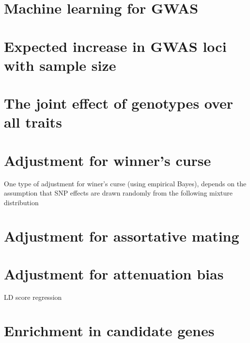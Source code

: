 \documentclass[
]{book}
\begin{document}
\hypertarget{machine-learning-for-gwas}{%
\section{Machine learning for GWAS}\label{machine-learning-for-gwas}}

\hypertarget{expected-increase-in-gwas-loci-with-sample-size}{%
\section{Expected increase in GWAS loci with sample size}\label{expected-increase-in-gwas-loci-with-sample-size}}

\hypertarget{the-joint-effect-of-genotypes-over-all-traits}{%
\section{The joint effect of genotypes over all traits}\label{the-joint-effect-of-genotypes-over-all-traits}}

\hypertarget{adjustment-for-winners-curse}{%
\section{Adjustment for winner's curse}\label{adjustment-for-winners-curse}}

One type of adjustment for winer's curse (using empirical Bayes), depends on the assumption that SNP effects are drawn randomly from the following mixture distribution

\hypertarget{adjustment-for-assortative-mating}{%
\section{Adjustment for assortative mating}\label{adjustment-for-assortative-mating}}

\hypertarget{adjustment-for-attenuation-bias}{%
\section{Adjustment for attenuation bias}\label{adjustment-for-attenuation-bias}}

LD score regression

\hypertarget{enrichment-in-candidate-genes}{%
\section{Enrichment in candidate genes}\label{enrichment-in-candidate-genes}}
\end{document}
